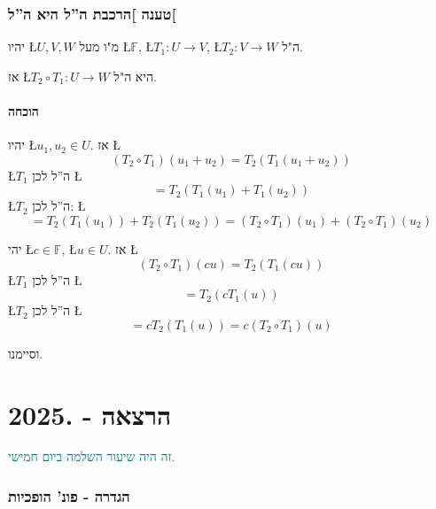 \documentclass[english,hebrew]{article}
\begin{document}
\section{טענה {]}הרכבת ה\textquotedblright ל היא ה\textquotedblright ל{[}}

יהיו \L{$U,V,W$} מ"ו מעל \L{$\mathbb{F}$}, \L{$T_{1}:U\to V$},
\L{$T_{2}:V\to W$} ה"ל.

אז \L{$T_{2}\circ T_{1}:U\to W$} היא ה"ל.

\subsection{הוכחה}

יהיו \L{$u_{1},u_{2}\in U$}. אז \L{%
\[
(T_{2}\circ T_{1})(u_{1}+u_{2})=T_{2}(T_{1}(u_{1}+u_{2}))
\]
}%
 \L{$T_{1}$} ה\textquotedblright ל לכן \L{%
\[
=T_{2}(T_{1}(u_{1})+T_{1}(u_{2}))
\]
}%
 \L{$T_{2}$} ה\textquotedblright ל לכן: \L{%
\[
=T_{2}(T_{1}(u_{1}))+T_{2}(T_{1}(u_{2}))=(T_{2}\circ T_{1})(u_{1})+(T_{2}\circ T_{1})(u_{2})
\]
}%

יהי \L{$c\in\mathbb{F}$}, \L{$u\in U$}. אז \L{%
\[
(T_{2}\circ T_{1})(cu)=T_{2}(T_{1}(cu))
\]
}%
 \L{$T_{1}$} ה\textquotedblright ל לכן \L{%
\[
=T_{2}(cT_{1}(u))
\]
}%
 \L{$T_{2}$} ה\textquotedblright ל לכן \L{%
\[
=cT_{2}(T_{1}(u))=c(T_{2}\circ T_{1})(u)
\]
}%

וסיימנו.

\newpage{}

\noindent{}

\part{הרצאה {\endL} - {.2025\endL}}

\textcolor{teal}{זה היה שיעור השלמה ביום חמישי.}

\section{הגדרה - פונ' הופכיות}
\end{document}
